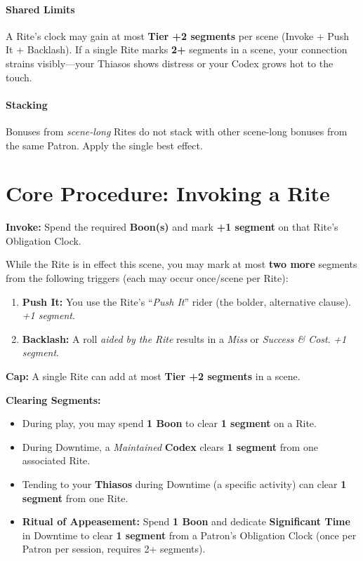 \documentclass[12pt,twoside]{book}
\begin{document}
\paragraph{Shared Limits}
A Rite's clock may gain at most \textbf{Tier +2 segments} per scene (Invoke + Push It + Backlash). If a single Rite marks \textbf{2+} segments in a scene, your connection strains visibly—your Thiasos shows distress or your Codex grows hot to the touch.

\paragraph{Stacking}
Bonuses from \emph{scene-long} Rites do not stack with other scene-long bonuses from the same Patron. Apply the single best effect.

\section{Core Procedure: Invoking a Rite}
\label{sec:rite-procedure}
\textbf{Invoke:} Spend the required \textbf{Boon(s)} and mark \textbf{+1 segment} on that Rite's Obligation Clock.

While the Rite is in effect this scene, you may mark at most \textbf{two more} segments from the following triggers (each may occur once/scene per Rite):
\begin{enumerate}
  \item \textbf{Push It:} You use the Rite's ``\emph{Push It}'' rider (the bolder, alternative clause). \emph{+1 segment}.
  \item \textbf{Backlash:} A roll \emph{aided by the Rite} results in a \emph{Miss} or \emph{Success \& Cost}. \emph{+1 segment}.
\end{enumerate}
\textbf{Cap:} A single Rite can add at most \textbf{Tier +2 segments} in a scene.

\textbf{Clearing Segments:}
\begin{itemize}
  \item During play, you may spend \textbf{1 Boon} to clear \textbf{1 segment} on a Rite.
  \item During Downtime, a \emph{Maintained} \textbf{Codex} clears \textbf{1 segment} from one associated Rite.
  \item Tending to your \textbf{Thiasos} during Downtime (a specific activity) can clear \textbf{1 segment} from one Rite.
  \item \textbf{Ritual of Appeasement:} Spend \textbf{1 Boon} and dedicate \textbf{Significant Time} in Downtime to clear \textbf{1 segment} from a Patron's Obligation Clock (once per Patron per session, requires 2+ segments).
\end{itemize}
\end{document}
